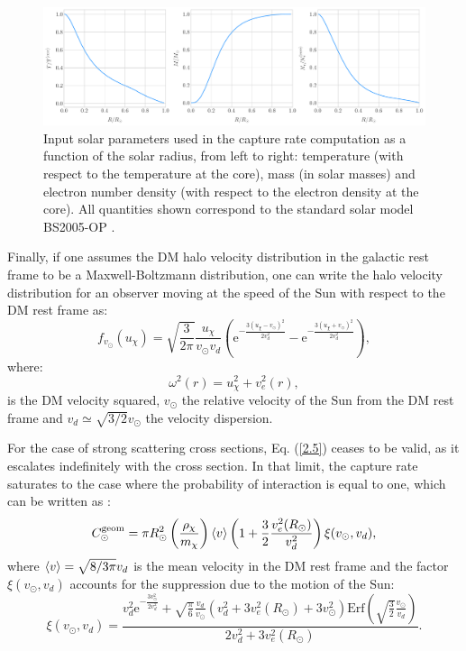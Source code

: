 \begin{figure}[t]
	\centering
	\includegraphics[width=1\linewidth]{Images/DM_Analysis/ssm_params.pdf}
	\caption[Input solar parameters used in the capture rate computation as a function of the solar radius.]{Input solar parameters used in the capture rate computation as a function of the solar radius, from left to right: temperature (with respect to the temperature at the core), mass (in solar masses) and electron number density (with respect to the electron density at the core). All quantities shown correspond to the standard solar model BS2005-OP \cite{Bahcall2004}.}
	\label{fig:ssm_params}
\end{figure}

Finally, if one assumes the DM halo velocity distribution in the galactic rest frame to be a Maxwell-Boltzmann distribution, one can write the halo velocity distribution for an observer moving at the speed of the Sun with respect to the DM rest frame as:
\begin{equation}\label{2.12}
	f_{v_{\odot}}(u_{\chi}) = \sqrt{\frac{3}{2\pi}} \frac{u_{\chi}}{v_{\odot} v_{d}} \left(\mathrm{e}^{-\frac{3(u_{\chi}-v_{\odot})^{2}}{2v_{d}^{2}}}-\mathrm{e}^{-\frac{3(u_{\chi}+v_{\odot})^{2}}{2v_{d}^{2}}}\right),
\end{equation}
where:
\begin{equation}\label{2.13}
	\omega^{2}(r) = u_{\chi}^{2} + v_{e}^{2}(r),
\end{equation}
is the DM velocity squared, $v_{\odot}$ the relative velocity of the Sun from the DM rest frame and $v_{d} \simeq \sqrt{3/2} v_{\odot}$ the velocity dispersion.

For the case of strong scattering cross sections, Eq. (\ref{2.5}) ceases to be valid, as it escalates indefinitely with the cross section. In that limit, the capture rate saturates to the case where the probability of interaction is equal to one, which can be written as \cite{Gould1987a}:
\begin{equation}\label{2.14}
	C_{\odot}^{\mathrm{geom}} = \pi R_{\odot}^{2} \left(\frac{\rho_{\chi}}{m_{\chi}}\right) \expval{v} \left(1+\frac{3}{2}\frac{v_{e}^{2}(R_{\odot})}{v_{d}^{2}}\right) \xi(v_{\odot}, v_{d}),
\end{equation}
where $\expval{v} = \sqrt{8/3\pi} v_{d}$ is the mean velocity in the DM rest frame and the factor $\xi(v_{\odot}, v_{d})$ accounts for the suppression due to the motion of the Sun:
\begin{equation}\label{2.15}
	\xi(v_{\odot}, v_{d}) = \frac{v_{d}^{2}\mathrm{e}^{-\frac{3v_{\odot}^{2}}{2v_{d}^{2}}}+\sqrt{\frac{\pi}{6}}\frac{v_{d}}{v_{\odot}}\left(v_{d}^{2}+3v_{e}^{2}(R_{\odot})+3v_{\odot}^{2}\right)\mathrm{Erf}\left(\sqrt{\frac{3}{2}}\frac{v_{\odot}}{v_{d}}\right)}{2v_{d}^{2}+3v_{e}^{2}(R_{\odot})}.
\end{equation}

